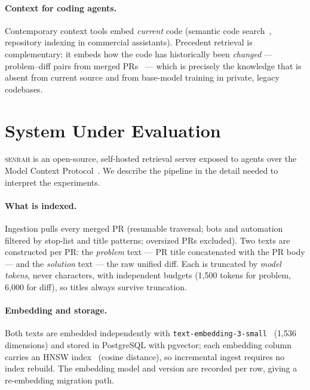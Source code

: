 \documentclass[sigconf,nonacm]{acmart}
\begin{document}
\paragraph{Context for coding agents.}
Contemporary context tools embed \emph{current} code (semantic code
search~\cite{husain2019codesearchnet}, repository indexing in commercial
assistants). Precedent retrieval is complementary: it embeds how the code
has historically been \emph{changed} --- problem--diff pairs from merged
PRs~\cite{gousios2014exploratory} --- which is precisely the knowledge that
is absent from current source and from base-model training in private,
legacy codebases.

\section{System Under Evaluation}
\label{sec:system}

\textsc{senrah} is an open-source, self-hosted retrieval server exposed to
agents over the Model Context Protocol~\cite{mcp2024}. We describe the
pipeline in the detail needed to interpret the experiments.

\paragraph{What is indexed.}
Ingestion pulls every merged PR (resumable traversal; bots and automation
filtered by stop-list and title patterns; oversized PRs excluded). Two
texts are constructed per PR: the \emph{problem} text --- PR title
concatenated with the PR body --- and the \emph{solution} text --- the raw
unified diff. Each is truncated by \emph{model tokens}, never characters,
with independent budgets (1{,}500 tokens for problem, 6{,}000 for diff),
so titles always survive truncation.

\paragraph{Embedding and storage.}
Both texts are embedded independently with
\texttt{text-embedding-3-small}~\cite{openai2024embeddings} (1{,}536
dimensions) and stored in PostgreSQL with pgvector; each embedding column
carries an HNSW index~\cite{malkov2020hnsw} (cosine distance), so
incremental ingest requires no index rebuild. The embedding model and
version are recorded per row, giving a re-embedding migration path.
\end{document}
